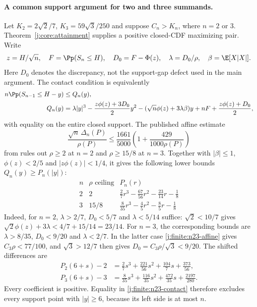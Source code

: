 \paragraph{A common support argument for two and three summands.}
Let $K_2=2\sqrt2/7$, $K_3=59\sqrt3/250$ and suppose $C_n>K_n$,
where $n=2$ or $3$.  Theorem~\ref{j:core:attainment} supplies a
positive closed-CDF maximizing pair.  Write
\[
 z=H/\sqrt n,\quad F=\Pp(S_n\le H),\quad D_0=F-\Phi(z),
 \quad \lambda=D_0/\rho,\quad \beta=\E[X|X|].
\]
Here $D_0$ denotes the discrepancy, not the support-gap defect used in
the main argument.  The contact condition is equivalently
\begin{align}
 n\Pp(S_{n-1}\le H-y)&\le Q_n(y),\notag\\
 Q_n(y)&=\lambda|y|^3-\frac{z\phi(z)+3D_0}{2}y^2
 -(\sqrt n\phi(z)+3\lambda\beta)y
 +nF+\frac{z\phi(z)+D_0}{2},\label{j:finite:n23-contact}
\end{align}
with equality on the entire closed support.
The published affine estimate
\begin{equation}\label{j:finite:n23-affine}
 \frac{\sqrt n\,\Delta_n(P)}{\rho(P)}\le\frac{1661}{5000}
       \left(1+\frac{429}{1000\rho(P)}\right)
\end{equation}
from \citet{Shevtsova2013} rules out $\rho\ge2$ at $n=2$ and
$\rho\ge15/8$ at $n=3$.  Together with $|\beta|\le1$,
$\phi(z)<2/5$ and $|z\phi(z)|<1/4$, it gives the following lower
bounds $Q_n(y)\ge P_n(|y|)$:
\begingroup\renewcommand{\arraystretch}{1.8}
\[
\begin{array}{c|c|c}
 n&\rho\text{ ceiling}&P_n(r)\\\hline
 2&2&\displaystyle\frac27r^3-\frac{67}{56}r^2-\frac{23}{14}r-\frac18\\[2pt]
 3&15/8&\displaystyle\frac8{35}r^3-\frac45r^2-\frac85r-\frac18
\end{array}
\]
\endgroup
Indeed, for $n=2$, $\lambda>2/7$, $D_0<5/7$ and
$\lambda<5/14$ suffice: $\sqrt2<10/7$ gives
$\sqrt2\phi(z)+3\lambda<4/7+15/14=23/14$.
For $n=3$, the corresponding bounds are
$\lambda>8/35$, $D_0<9/20$ and $\lambda<2/7$.
In the latter case \eqref{j:finite:n23-affine} gives $C_3\rho<77/100$,
and $\sqrt3>12/7$ then gives $D_0=C_3\rho/\sqrt3<9/20$.
The shifted differences are
\begin{align*}
 P_2(6+s)-2&=\frac27s^3+\frac{221}{56}s^2+
                  \frac{104}{7}s+\frac{373}{56},\\
 P_3(6+s)-3&=\frac8{35}s^3+\frac{116}{35}s^2+
                  \frac{472}{35}s+\frac{2197}{280}.
\end{align*}
Every coefficient is positive.  Equality in
\eqref{j:finite:n23-contact} therefore excludes every support point with
$|y|\ge6$, because its left side is at most $n$.

